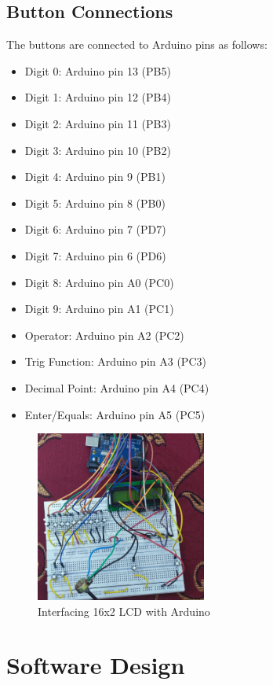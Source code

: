 \documentclass[12pt,a4paper]{article}
\begin{document}
\subsection{Button Connections}
The buttons are connected to Arduino pins as follows:
\begin{itemize}
    \item Digit 0: Arduino pin 13 (PB5)
    \item Digit 1: Arduino pin 12 (PB4)
    \item Digit 2: Arduino pin 11 (PB3)
    \item Digit 3: Arduino pin 10 (PB2)
    \item Digit 4: Arduino pin 9 (PB1)
    \item Digit 5: Arduino pin 8 (PB0)
    \item Digit 6: Arduino pin 7 (PD7)
    \item Digit 7: Arduino pin 6 (PD6)
    \item Digit 8: Arduino pin A0 (PC0)
    \item Digit 9: Arduino pin A1 (PC1)
    \item Operator: Arduino pin A2 (PC2)
    \item Trig Function: Arduino pin A3 (PC3)
    \item Decimal Point: Arduino pin A4 (PC4)
    \item Enter/Equals: Arduino pin A5 (PC5)
\end{itemize}

\begin{figure}[h]
    \centering
    \includegraphics[width=0.5\textwidth]{circuit.jpeg} %
    \caption{Interfacing 16x2 LCD with Arduino}
    \label{fig:lcd_circuit}
\end{figure}

\section{Software Design}
\end{document}
